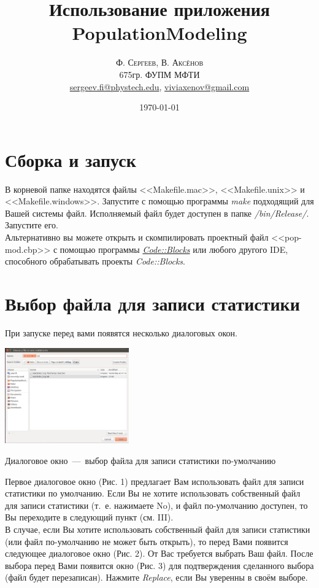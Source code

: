 \documentclass[11pt,twoside,twocolumn,russian,a4paper]{article}
\title{\normalfont\color{blue} Использование приложения PopulationModeling} %
\author{
	\textsc{Ф. Сергеев, В. Аксёнов} \\[0.5ex] %
	\normalsize 675гр. ФУПМ МФТИ \\ %
	\normalsize \href{mailto:sergeev.fi@phystech.edu}{sergeev.fi@phystech.edu}, \href{mailto:viviaxenov@gmail.com}{viviaxenov@gmail.com}	\normalsize 
}
\date{\today} %
\begin{document}
\maketitle

\section{\color{blue}Сборка и запуск}

В корневой папке находятся файлы <<Makefile.mac>>, <<Makefile.unix>> и <<Makefile.windows>>. Запустите с помощью программы \textit{make} подходящий для Вашей системы файл. Исполняемый файл будет доступен в папке \textit{/bin/Release/}. Запустите его.\smallskip\\
Альтернативно вы можете открыть и скомпилировать проектный файл <<pop-mod.cbp>> с помощью программы \color{blue}\href{http://www.codeblocks.org/}{\textit{Code::Blocks}}\color{black} или любого другого IDE, способного обрабатывать проекты \textit{Code::Blocks}.

\section{\color{blue}Выбор файла для записи статистики}

При запуске перед вами появятся несколько диалоговых окон.\\

\begin{center}
\captionsetup{type=figure}
  	\includegraphics[width=0.4\textwidth]{help-scr2.png}
	\caption{Диалоговое окно~---~выбор файла для записи статистики по-умолчанию}
\end{center}

\noindent Первое диалоговое окно (Рис. 1) предлагает Вам использовать файл для записи статистики по умолчанию. Если Вы не хотите использовать собственный файл для записи статистики (т.~е. нажимаете No), и файл по-умолчанию доступен, то Вы переходите в следующий пункт (см. III).\smallskip\\
В случае, если Вы хотите использовать собственный файл для записи статистики (или файл по-умолчанию не может быть открыть), то перед Вами появится следующее диалоговое окно (Рис. 2). От Вас требуется выбрать Ваш файл. После выбора перед Вами появится окно (Рис. 3) для подтверждения сделанного выбора (файл будет перезаписан). Нажмите \textit{Replace}, если Вы уверенны в своём выборе.
\end{document}
